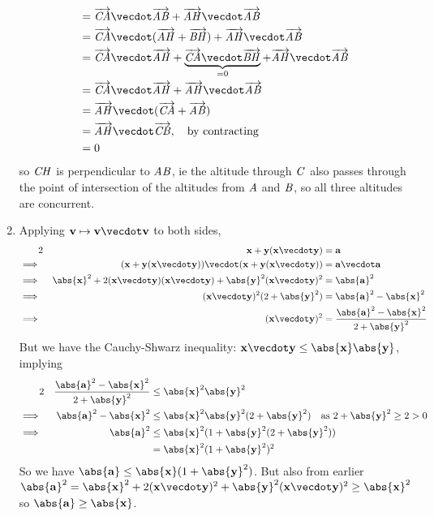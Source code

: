 \documentclass[fleqn,a4paper,11pt]{article}
\begin{document}
\begin{enumerate}
\begin{align*}
      &= \veca{CA} \vecdot \veca{AB} + \veca{AH} \vecdot \veca{AB} \\
      &= \veca{CA} \vecdot (\veca{AH} + \veca{BH})
         + \veca{AH} \vecdot \veca{AB} \\
      &= \veca{CA} \vecdot \veca{AH}
         + \underbrace{\veca{CA} \vecdot \veca{BH}}_{= 0}
         + \veca{AH} \vecdot \veca{AB} \\
      &= \veca{CA} \vecdot \veca{AH} + \veca{AH} \vecdot \veca{AB} \\
      &= \veca{AH} \vecdot (\veca{CA} + \veca{AB}) \\
      &= \veca{AH} \vecdot \veca{CB}, \quad \text{by contracting} \\
      &= 0
    \end{align*}
    so \(\mathit{CH}\) is perpendicular to \(\mathit{AB}\), ie the altitude through
    \(\mathit{C}\) also passes through the point of intersection of the altitudes
    from \(\mathit{A}\) and \(\mathit{B}\), so all three altitudes are concurrent.
   \item
    Applying \(\vec v \mapsto \vec v \vecdot \vec v\) to both sides,
    \begin{alignat*}2
     &&  \vec x + \vec y (\vec x \vecdot \vec y) &= \vec a \\
     \implies{}&&
         (\vec x + \vec y (\vec x \vecdot \vec y)) \vecdot
         (\vec x + \vec y (\vec x \vecdot \vec y)) &=
         \vec a \vecdot \vec a \\
     \implies{}&& \abs{\vec x}^2
                  + 2(\vec x \vecdot \vec y)(\vec x \vecdot \vec y)
                  + \abs{\vec y}^2(\vec x \vecdot \vec y)^2 &=
                  \abs{\vec a}^2 \\
     \implies{}&& (\vec x \vecdot \vec y)^2 (2 + \abs{\vec y}^2) &=
                  \abs{\vec a}^2 - \abs{\vec x}^2 \\
     \implies{}&& (\vec x \vecdot \vec y)^2 &=
                  \frac{\abs{\vec a}^2 - \abs{\vec x}^2}{2 + \abs{\vec y}^2}
    \end{alignat*}
    But we have the Cauchy-Shwarz inequality:
    \(\vec x \vecdot \vec y \le \abs{\vec x}\abs{\vec y}\),
    implying
    \begin{alignat*}2
     && \frac{\abs{\vec a}^2 - \abs{\vec x}^2}{2 + \abs{\vec y}^2} &\le
        \abs{\vec x}^2\abs{\vec y}^2 \\
     \implies{}&& \abs{\vec a}^2 - \abs{\vec x}^2 &\le
        \abs{\vec x}^2\abs{\vec y}^2(2 + \abs{\vec y}^2) \quad
        \text{as \(2 + \abs{\vec y}^2 \ge 2 > 0\)} \\
     \implies{}&& \abs{\vec a}^2 &\le
        \abs{\vec x}^2(1 + \abs{\vec y}^2(2 + \abs{\vec y}^2)) \\
     &&        &= \abs{\vec x}^2(1 + \abs{\vec y}^2)^2
    \end{alignat*}
    So we have \(\abs{\vec a} \le \abs{\vec x}(1 + \abs{\vec y}^2)\).
    But also from earlier
    \(\abs{\vec a}^2 = \abs{\vec x}^2 + 2(\vec x \vecdot \vec y)^2
                       + \abs{\vec y}^2(\vec x \vecdot \vec y)^2
                     \ge \abs{\vec x}^2\)
    so \(\abs{\vec a} \ge \abs{\vec x}\).


\end{enumerate}
\end{document}
